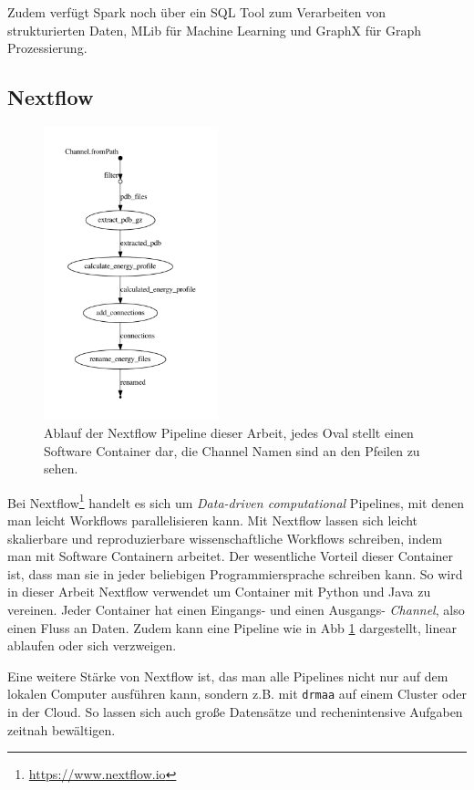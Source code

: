 Zudem verfügt Spark noch über ein SQL Tool zum Verarbeiten von strukturierten Daten, MLib für Machine Learning und GraphX für Graph Prozessierung.




\newpage
\subsection{Nextflow}

\begin{figure}
\centering
\includegraphics[width=0.45\textwidth]{images/flowchart.pdf}
\caption{Ablauf der Nextflow Pipeline dieser Arbeit, jedes Oval stellt einen Software Container dar, die Channel Namen sind an den Pfeilen zu sehen.}
\label{fig:nextflow_pipe}
\end{figure}
Bei Nextflow\footnote{\url{https://www.nextflow.io}} handelt es sich um \emph{Data-driven computational} Pipelines, mit denen man leicht Workflows parallelisieren kann. Mit Nextflow lassen sich leicht skalierbare und reproduzierbare wissenschaftliche Workflows schreiben, indem man mit Software Containern arbeitet. Der wesentliche Vorteil dieser Container ist, dass man sie in jeder beliebigen Programmiersprache schreiben kann. So wird in dieser Arbeit Nextflow verwendet um Container mit Python und Java zu vereinen. Jeder Container hat einen Eingangs- und einen Ausgangs- \emph{Channel}, also einen Fluss an Daten. Zudem kann eine Pipeline wie in \ac{Abb} \ref{fig:nextflow_pipe} dargestellt, linear ablaufen oder sich verzweigen.

Eine weitere Stärke von Nextflow ist, das man alle Pipelines nicht nur auf dem lokalen Computer ausführen kann, sondern z.B. mit \texttt{drmaa} auf einem Cluster oder in der Cloud. So lassen sich auch große Datensätze und rechenintensive Aufgaben zeitnah bewältigen.


